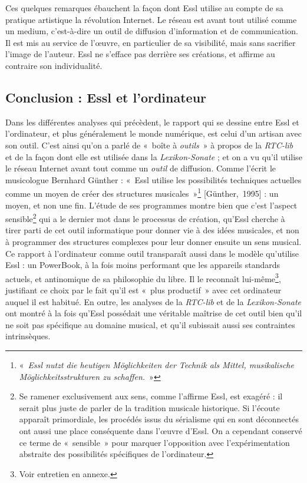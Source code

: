 \documentclass[a4paper,12pt]{article}
\newcommand{\guill}[1]{«~#1~»}
\newcommand{\cicite}[1]{{\footnotesize[#1]}}
\begin{document}
Ces quelques remarques ébauchent la façon dont Essl utilise au compte de sa pratique artistique la révolution Internet. Le réseau est avant tout utilisé comme un medium, c'est-à-dire un outil de diffusion d'information et de communication. Il est mis au service de l'œuvre, en particulier de sa visibilité, mais sans sacrifier l'image de l'auteur. Essl ne s'efface pas derrière ses créations, et affirme au contraire son individualité.

\subsection{Conclusion : Essl et l'ordinateur}

Dans les différentes analyses qui précèdent, le rapport qui se dessine entre Essl et l'ordinateur, et plus généralement le monde numérique, est celui d'un artisan avec son outil. C'est ainsi qu'on a parlé de \guill{boîte à \emph{outils}} à propos de la \emph{RTC-lib} et de la façon dont elle est utilisée dans la \emph{Lexikon-Sonate} ; et on a vu qu'il utilise le réseau Internet avant tout comme un \emph{outil} de diffusion. Comme l'écrit le musicologue Bernhard Günther : \guill{Essl utilise les possibilités techniques actuelles comme un moyen de créer des structures musicales}\footnote{\guill{\emph{Essl nutzt die heutigen Möglichkeiten der Technik als Mittel, musikalische Möglichkeitsstrukturen zu schaffen.}}} \cicite{Günther,~1995} : un moyen, et non une fin. L'étude de ses programmes montre bien que c'est l'aspect sensible\footnote{Se ramener exclusivement aux sens, comme l'affirme Essl, est exagéré : il serait plus juste de parler de la tradition musicale historique. Si l'écoute apparaît primordiale, les procédés issus du sérialisme qui en sont déconnectés ont aussi une place conséquente dans l'œuvre d'Essl. On a cependant conservé ce terme de \guill{sensible} pour marquer l'opposition avec l'expérimentation abstraite des possibilités spécifiques de l'ordinateur.} qui a le dernier mot dans le processus de création, qu'Essl cherche à tirer parti de cet outil informatique pour donner vie à des idées musicales, et non à programmer des structures complexes pour leur donner ensuite un sens musical. Ce rapport à l'ordinateur comme outil transparaît aussi dans le modèle qu'utilise Essl : un PowerBook, à la fois moins performant que les appareils standards actuels, et antinomique de sa philosophie du libre. Il le reconnaît lui-même\footnote{Voir entretien en annexe.}, justifiant ce choix par le fait qu'il est \guill{plus productif} avec cet ordinateur auquel il est habitué. En outre, les analyses de la \emph{RTC-lib} et de la \emph{Lexikon-Sonate} ont montré à la fois qu'Essl possédait une véritable maîtrise de cet outil bien qu'il ne soit pas spécifique au domaine musical, et qu'il subissait aussi ses contraintes intrinsèques.
\end{document}
